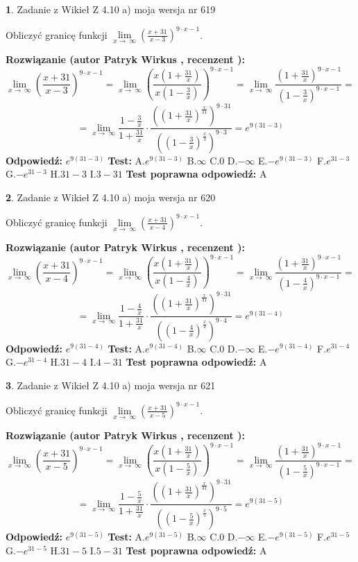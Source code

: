 \documentclass[12pt, a4paper]{article}
\theoremstyle{definition} %
\newtheorem{zad}{}
\newcommand{\zadStart}[1]{\begin{zad}#1\newline}
\newcommand{\zadStop}{\end{zad}}
\newcommand{\rozwStart}[2]{\noindent \textbf{Rozwiązanie (autor #1 , recenzent #2): }\newline}
\newcommand{\rozwStop}{\newline}
\newcommand{\odpStart}{\noindent \textbf{Odpowiedź:}\newline}
\newcommand{\odpStop}{\newline}
\newcommand{\testStart}{\noindent \textbf{Test:}\newline}
\newcommand{\testStop}{\newline}
\newcommand{\kluczStart}{\noindent \textbf{Test poprawna odpowiedź:}\newline}
\newcommand{\kluczStop}{\newline}
\begin{document}
\zadStart{Zadanie z Wikieł Z 4.10 a) moja wersja nr 619}


Obliczyć granicę funkcji  $\lim\limits_{x\to\ \infty}(\frac{x+31}{x-3})^{9\cdot x-1}$.
\zadStop
\rozwStart{Patryk Wirkus}{}
$$\lim\limits_{x\to\ \infty}(\frac{x+31}{x-3})^{9\cdot x-1} = \lim\limits_{x\to\ \infty}(\frac{x(1+\frac{31}{x})}{x(1-\frac{3}{x})})^{9\cdot x-1}=\lim\limits_{x\to\ \infty}\frac{(1+\frac{31}{x})^{9\cdot x-1}}{(1-\frac{3}{x})^{9\cdot x-1}}=$$
$$=\lim\limits_{x\to\ \infty}\frac{1-\frac{3}{x}}{1+\frac{31}{x}}\cdot\frac{((1+\frac{31}{x})^{\frac{x}{31}})^{9\cdot31}}{((1-\frac{3}{x})^{\frac{x}{3}})^{9\cdot3}}=e^{9(31-3)}$$
\rozwStop
\odpStart
$e^{9(31-3)}$
\odpStop
\testStart
A.$e^{9(31-3)}$ B.$\infty$ C.$0$ D.$-\infty$ E.$-e^{9(31-3)}$
F.$e^{31-3}$ G.$-e^{31-3}$
H.$31-3$
I.$3-31$
\testStop
\kluczStart
A
\kluczStop



\zadStart{Zadanie z Wikieł Z 4.10 a) moja wersja nr 620}


Obliczyć granicę funkcji  $\lim\limits_{x\to\ \infty}(\frac{x+31}{x-4})^{9\cdot x-1}$.
\zadStop
\rozwStart{Patryk Wirkus}{}
$$\lim\limits_{x\to\ \infty}(\frac{x+31}{x-4})^{9\cdot x-1} = \lim\limits_{x\to\ \infty}(\frac{x(1+\frac{31}{x})}{x(1-\frac{4}{x})})^{9\cdot x-1}=\lim\limits_{x\to\ \infty}\frac{(1+\frac{31}{x})^{9\cdot x-1}}{(1-\frac{4}{x})^{9\cdot x-1}}=$$
$$=\lim\limits_{x\to\ \infty}\frac{1-\frac{4}{x}}{1+\frac{31}{x}}\cdot\frac{((1+\frac{31}{x})^{\frac{x}{31}})^{9\cdot31}}{((1-\frac{4}{x})^{\frac{x}{4}})^{9\cdot4}}=e^{9(31-4)}$$
\rozwStop
\odpStart
$e^{9(31-4)}$
\odpStop
\testStart
A.$e^{9(31-4)}$ B.$\infty$ C.$0$ D.$-\infty$ E.$-e^{9(31-4)}$
F.$e^{31-4}$ G.$-e^{31-4}$
H.$31-4$
I.$4-31$
\testStop
\kluczStart
A
\kluczStop



\zadStart{Zadanie z Wikieł Z 4.10 a) moja wersja nr 621}


Obliczyć granicę funkcji  $\lim\limits_{x\to\ \infty}(\frac{x+31}{x-5})^{9\cdot x-1}$.
\zadStop
\rozwStart{Patryk Wirkus}{}
$$\lim\limits_{x\to\ \infty}(\frac{x+31}{x-5})^{9\cdot x-1} = \lim\limits_{x\to\ \infty}(\frac{x(1+\frac{31}{x})}{x(1-\frac{5}{x})})^{9\cdot x-1}=\lim\limits_{x\to\ \infty}\frac{(1+\frac{31}{x})^{9\cdot x-1}}{(1-\frac{5}{x})^{9\cdot x-1}}=$$
$$=\lim\limits_{x\to\ \infty}\frac{1-\frac{5}{x}}{1+\frac{31}{x}}\cdot\frac{((1+\frac{31}{x})^{\frac{x}{31}})^{9\cdot31}}{((1-\frac{5}{x})^{\frac{x}{5}})^{9\cdot5}}=e^{9(31-5)}$$
\rozwStop
\odpStart
$e^{9(31-5)}$
\odpStop
\testStart
A.$e^{9(31-5)}$ B.$\infty$ C.$0$ D.$-\infty$ E.$-e^{9(31-5)}$
F.$e^{31-5}$ G.$-e^{31-5}$
H.$31-5$
I.$5-31$
\testStop
\kluczStart
A
\kluczStop
\end{document}

